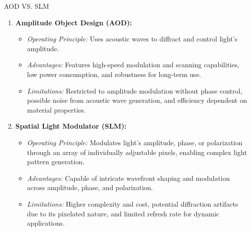 \documentclass[18 pt]{beamer}
\begin{document}
\begin{frame}{AOD VS. SLM}
  \begin{enumerate}[itemsep=10pt]
    \item \textbf{Amplitude Object Design (AOD):}
    \begin{itemize}[itemsep=5pt]
      \small
      \item \textit{Operating Principle:} Uses acoustic waves to diffract and control light's amplitude.
      \item \textit{Advantages:} Features high-speed modulation and scanning capabilities, low power consumption, and robustness for long-term use.
      \item \textit{Limitations:} Restricted to amplitude modulation without phase control, possible noise from acoustic wave generation, and efficiency dependent on material properties.
    \end{itemize}
    \item \textbf{Spatial Light Modulator (SLM):}
    \begin{itemize}[itemsep=5pt]
        \item \small \textit{Operating Principle:} Modulates light's amplitude, phase, or polarization through an array of individually adjustable pixels, enabling complex light pattern generation.
        \item \textit{Advantages:} Capable of intricate wavefront shaping and modulation across amplitude, phase, and polarization.
        \item \textit{Limitations:} Higher complexity and cost, potential diffraction artifacts due to its pixelated nature, and limited refresh rate for dynamic applications.
    \end{itemize}
  \end{enumerate}
\end{frame}
\end{document}
